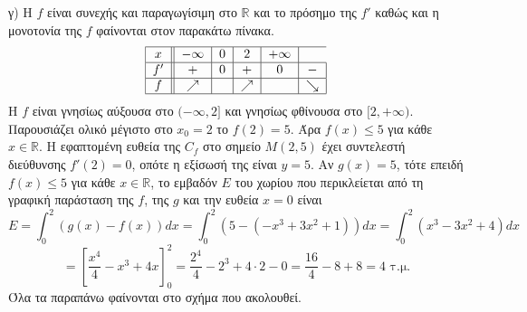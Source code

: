 \begin{alist}
\item γ) Η $f$ είναι συνεχής και παραγωγίσιμη στο $\mathbb{R}$ και το πρόσημο της $f'$ καθώς και η μονοτονία της $f$ φαίνονται στον παρακάτω πίνακα.
\[
\begin{tabular}{|c||c|c|c|c|c|}
\hline
$x$ & $-\infty$ & $0$ & $2$ & $+\infty$ \\
\hline
$f'$ & $+$ & $0$ & $+$ & $0$ & $-$ \\
\hline
$f$ & $\nearrow$ & & $\nearrow$ & & $\searrow$ \\
\hline
\end{tabular}
\]
Η $f$ είναι γνησίως αύξουσα στο $(-\infty, 2]$ και γνησίως φθίνουσα στο $[2, +\infty)$.
Παρουσιάζει ολικό μέγιστο στο $x_0=2$ το $f(2)=5$. Άρα $f(x) \le 5$ για κάθε $x \in \mathbb{R}$.
Η εφαπτομένη ευθεία της $C_f$ στο σημείο $M(2,5)$ έχει συντελεστή διεύθυνσης $f'(2)=0$, οπότε η εξίσωσή της είναι $y=5$.
Αν $g(x)=5$, τότε επειδή $f(x) \le 5$ για κάθε $x \in \mathbb{R}$, το εμβαδόν $E$ του χωρίου που περικλείεται από τη γραφική παράσταση της $f$, της $g$ και την ευθεία $x=0$ είναι
\[ E = \int_0^2 (g(x) - f(x)) dx = \int_0^2 (5 - (-x^3+3x^2+1)) dx = \int_0^2 (x^3-3x^2+4) dx \]
\[ = \left[\frac{x^4}{4} - x^3 + 4x\right]_0^2 = \frac{2^4}{4} - 2^3 + 4 \cdot 2 - 0 = \frac{16}{4} - 8 + 8 = 4 \text{ τ.μ.} \]
Όλα τα παραπάνω φαίνονται στο σχήμα που ακολουθεί.
\end{alist}

